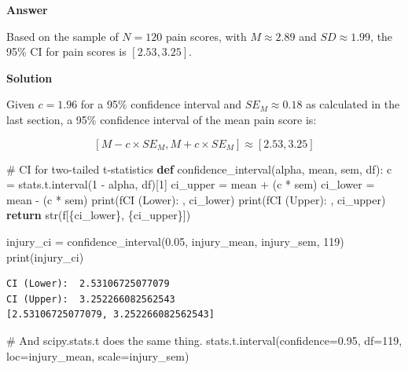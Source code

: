 \documentclass[
  a4paper,
  DIV=11,
  numbers=noendperiod]{scrartcl}
\newenvironment{Shaded}{\begin{snugshade}}{\end{snugshade}}
\newcommand{\BuiltInTok}[1]{\textcolor[rgb]{0.00,0.23,0.31}{#1}}
\newcommand{\CommentTok}[1]{\textcolor[rgb]{0.37,0.37,0.37}{#1}}
\newcommand{\ControlFlowTok}[1]{\textcolor[rgb]{0.00,0.23,0.31}{\textbf{#1}}}
\newcommand{\DecValTok}[1]{\textcolor[rgb]{0.68,0.00,0.00}{#1}}
\newcommand{\FloatTok}[1]{\textcolor[rgb]{0.68,0.00,0.00}{#1}}
\newcommand{\KeywordTok}[1]{\textcolor[rgb]{0.00,0.23,0.31}{\textbf{#1}}}
\newcommand{\NormalTok}[1]{\textcolor[rgb]{0.00,0.23,0.31}{#1}}
\newcommand{\OperatorTok}[1]{\textcolor[rgb]{0.37,0.37,0.37}{#1}}
\newcommand{\SpecialCharTok}[1]{\textcolor[rgb]{0.37,0.37,0.37}{#1}}
\newcommand{\SpecialStringTok}[1]{\textcolor[rgb]{0.13,0.47,0.30}{#1}}
\begin{document}
\textbf{Answer}

Based on the sample of \(N = 120\) pain scores, with \(M \approx 2.89\)
and \(SD \approx 1.99\), the 95\% CI for pain scores is
\([2.53, 3.25]\).

\textbf{Solution}

Given \(c = 1.96\) for a 95\% confidence interval and
\(SE_M \approx 0.18\) as calculated in the last section, a 95\%
confidence interval of the mean pain score is:

\[
[M - c \times SE_M, M + c \times SE_M] \approx [2.53, 3.25]
\]

\begin{Shaded}
\begin{Highlighting}[numbers=left,,]
\CommentTok{\# CI for two{-}tailed t{-}statistics}
\KeywordTok{def}\NormalTok{ confidence\_interval(alpha, mean, sem, df): }
\NormalTok{    c }\OperatorTok{=}\NormalTok{ stats.t.interval(}\DecValTok{1} \OperatorTok{{-}}\NormalTok{ alpha, df)[}\DecValTok{1}\NormalTok{]}
\NormalTok{    ci\_upper }\OperatorTok{=}\NormalTok{ mean }\OperatorTok{+}\NormalTok{ (c }\OperatorTok{*}\NormalTok{ sem)}
\NormalTok{    ci\_lower }\OperatorTok{=}\NormalTok{ mean }\OperatorTok{{-}}\NormalTok{ (c }\OperatorTok{*}\NormalTok{ sem)}
    \BuiltInTok{print}\NormalTok{(}\SpecialStringTok{f\textquotesingle{}CI (Lower): \textquotesingle{}}\NormalTok{, ci\_lower)}
    \BuiltInTok{print}\NormalTok{(}\SpecialStringTok{f\textquotesingle{}CI (Upper): \textquotesingle{}}\NormalTok{, ci\_upper)}
    \ControlFlowTok{return} \BuiltInTok{str}\NormalTok{(}\SpecialStringTok{f\textquotesingle{}[}\SpecialCharTok{\{}\NormalTok{ci\_lower}\SpecialCharTok{\}}\SpecialStringTok{, }\SpecialCharTok{\{}\NormalTok{ci\_upper}\SpecialCharTok{\}}\SpecialStringTok{]\textquotesingle{}}\NormalTok{)}

\NormalTok{injury\_ci }\OperatorTok{=}\NormalTok{ confidence\_interval(}\FloatTok{0.05}\NormalTok{, injury\_mean, injury\_sem, }\DecValTok{119}\NormalTok{)}
\BuiltInTok{print}\NormalTok{(injury\_ci)}
\end{Highlighting}
\end{Shaded}

\begin{verbatim}
CI (Lower):  2.53106725077079
CI (Upper):  3.252266082562543
[2.53106725077079, 3.252266082562543]
\end{verbatim}

\begin{Shaded}
\begin{Highlighting}[numbers=left,,]
\CommentTok{\# And scipy.stats.t does the same thing. }
\NormalTok{stats.t.interval(confidence}\OperatorTok{=}\FloatTok{0.95}\NormalTok{, }
\NormalTok{                 df}\OperatorTok{=}\DecValTok{119}\NormalTok{, }
\NormalTok{                 loc}\OperatorTok{=}\NormalTok{injury\_mean, }
\NormalTok{                 scale}\OperatorTok{=}\NormalTok{injury\_sem)}
\end{Highlighting}
\end{Shaded}
\end{document}
